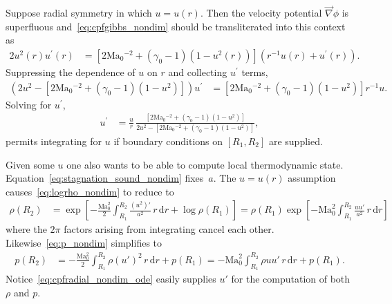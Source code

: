 \documentclass[letterpaper,11pt,nointlimits,reqno]{amsart}
\newcommand{\Mach}[1][]{\mbox{Ma}_{#1}}
\begin{document}
Suppose radial symmetry in which $u={u}\!\left(r\right)$.  Then the velocity
potential $\vec{\nabla}\phi$ is superfluous and~\eqref{eq:cpfgibbs_nondim}
should be transliterated into this context as
\begin{align}
       2 u^2\!\left(r\right) u^\prime\!\left(r\right)
    &=
       \left[
          2 \Mach[0]{}^{-2}
        + \left(\gamma_0-1\right) \left(1 - u^2\!\left(r\right)\right)
       \right]
       \left(
          r^{-1} u\!\left(r\right) + u^\prime\!\left(r\right)
       \right)
.
\end{align}
Suppressing the dependence of $u$ on $r$ and collecting $u^\prime$ terms,
\begin{align}
       \left(
           2 u^2
         - \left[
              2 \Mach[0]{}^{-2} + \left(\gamma_0-1\right) \left(1 - u^2\right)
           \right]
       \right)
       u^\prime
    &=
       \left[
          2 \Mach[0]{}^{-2} + \left(\gamma_0-1\right) \left(1 - u^2\right)
       \right]
       r^{-1} u
.
\end{align}
Solving for $u^\prime$,
\begin{align}
       u^\prime
    &=
       \frac{u}{r}
       \,
       \frac{
         \left[
            2 \Mach[0]{}^{-2} + \left(\gamma_0-1\right) \left(1 - u^2\right)
         \right]
       }{
           2 u^2
         - \left[
              2 \Mach[0]{}^{-2} + \left(\gamma_0-1\right) \left(1 - u^2\right)
           \right]
       }
\label{eq:cpfradial_nondim_ode}
,
\end{align}
permits integrating for $u$ if boundary conditions on $\left[R_1, R_2\right]$
are supplied.

Given some $u$ one also wants to be able to compute local thermodynamic state.
Equation~\eqref{eq:stagnation_sound_nondim} fixes~$a$.  The
$u=u\!\left(r\right)$ assumption causes~\eqref{eq:logrho_nondim} to reduce to
\begin{align}
  \rho\!\left(R_2\right)
  &=
  \exp\left[
    - \frac{\Mach[0]^2}{2} \int_{R_1}^{R_2}
        \frac{\left(u^2\right)'}{a^2}
      \, r \, \mathrm{d}r
    + \log\rho\!\left(R_1\right)
  \right]
   =
  \rho\!\left(R_1\right) \exp\left[
    - \Mach[0]^2 \int_{R_1}^{R_2}
        \frac{u u'}{a^2}
      \, r \, \mathrm{d}r
  \right]
\label{eq:cpfradial_nondim_rho}
\end{align}
where the $2\pi$ factors arising from integrating cancel each other.
Likewise~\eqref{eq:p_nondim} simplifies to
\begin{align}
  p\!\left(R_2\right)
  &=
    - \frac{\Mach[0]^2}{2} \int_{R_1}^{R_2}
        \rho \left(u'\right)^2
      \, r \, \mathrm{d}r
    + p\!\left(R_1\right)
   =
    -\Mach[0]^2 \int_{R_1}^{R_2} \rho u u' \, r \, \mathrm{d}r
      + p\!\left(R_1\right)
\label{eq:cpfradial_nondim_p}
.
\end{align}
Notice~\eqref{eq:cpfradial_nondim_ode} easily supplies $u'$ for the computation
of both $\rho$ and $p$.
\end{document}
